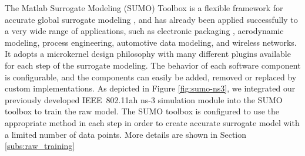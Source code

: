  The Matlab Surrogate Modeling (SUMO) Toolbox is a flexible framework for accurate global surrogate modeling \cite{SUMOtoolbox2010}, and has already been applied successfully to a very wide range of applications, such as electronic packaging , aerodynamic modeling, process engineering, automotive data modeling, and wireless networks.
 It adopts a microkernel design philosophy with many different plugins available for each step of the surrogate modeling. The behavior of each software component is configurable, and the components can easily be added, removed or replaced by custom implementations. As depicted in Figure \ref{fig:sumo-ns3}, we integrated our previously developed IEEE~802.11ah ns-3 simulation module \cite{WNS32018} into the SUMO toolbox to train the \gls{raw} model. The SUMO toolbox is configured to use the appropriate method in each step in order to create  accurate surrogate model with a limited number of data points. More details are  shown in Section \ref{subs:raw_training}
 










